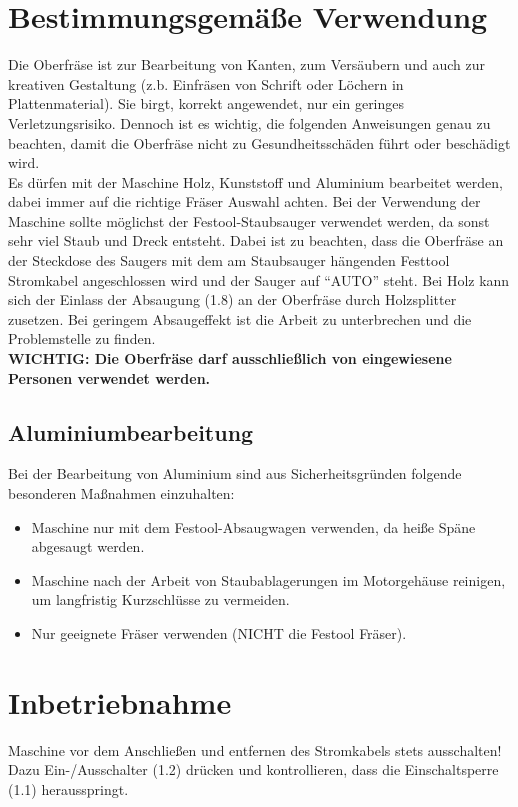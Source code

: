 \documentclass{\basedir/fablab-document}
\begin{document}
\section{Bestimmungsgemäße Verwendung}
Die Oberfräse ist zur Bearbeitung von Kanten, zum Versäubern und auch zur kreativen Gestaltung (z.b. Einfräsen von Schrift oder Löchern in Plattenmaterial). Sie birgt, korrekt angewendet, nur ein geringes Verletzungsrisiko. Dennoch ist es wichtig, die folgenden Anweisungen genau zu beachten, damit die Oberfräse nicht zu Gesundheitsschäden führt oder beschädigt wird.\\
Es dürfen mit der Maschine Holz, Kunststoff und Aluminium bearbeitet werden, dabei immer auf die richtige Fräser Auswahl achten. Bei der Verwendung der Maschine sollte möglichst der Festool-Staubsauger verwendet werden, da sonst sehr viel Staub und Dreck entsteht. Dabei ist zu beachten, dass die Oberfräse an der Steckdose des Saugers mit dem am Staubsauger hängenden Festtool Stromkabel angeschlossen wird und der Sauger auf \enquote{AUTO} steht. Bei Holz kann sich der Einlass der Absaugung (1.8) an der Oberfräse durch Holzsplitter zusetzen. Bei geringem Absaugeffekt ist die Arbeit zu unterbrechen und die Problemstelle zu finden.\\
\textbf{WICHTIG: Die Oberfräse darf ausschließlich von eingewiesene Personen verwendet werden.}


\subsection{Aluminiumbearbeitung}
Bei der Bearbeitung von Aluminium sind aus Sicherheitsgründen folgende besonderen Maßnahmen einzuhalten:
\begin{itemize}
\item Maschine nur mit dem Festool-Absaugwagen verwenden, da heiße Späne abgesaugt werden.
\item Maschine nach der Arbeit von Staubablagerungen im Motorgehäuse reinigen, um langfristig Kurzschlüsse zu vermeiden.
\item Nur geeignete Fräser verwenden (NICHT die Festool Fräser).
\end{itemize}


\section{Inbetriebnahme}
Maschine vor dem Anschließen und entfernen des Stromkabels stets ausschalten! Dazu Ein-/Ausschalter (1.2) drücken und kontrollieren, dass die Einschaltsperre (1.1) herausspringt.
\end{document}
